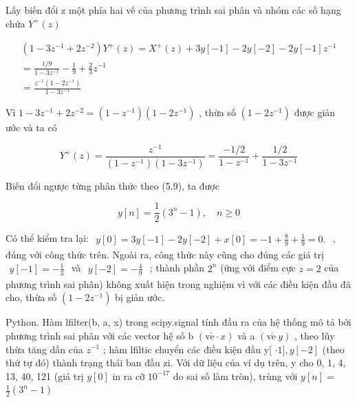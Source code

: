 \documentclass[
  10
]{article}
\begin{document}
Lấy biến đổi z một phía hai vế của phương trình sai phân và nhóm các số
hạng chứa \(Y ^ { + } ( z )\)

\[
\begin{array}{c} (1 - 3 z ^ {- 1} + 2 z ^ {- 2}) Y ^ {+} (z) = X ^ {+} (z) + 3 y [ - 1 ] - 2 y [ - 2 ] - 2 y [ - 1 ] z ^ {- 1} \\ = \frac {1 / 9}{1 - 3 z ^ {- 1}} - \frac {1}{9} + \frac {2}{3} z ^ {- 1} \\ = \frac {z ^ {- 1} (1 - 2 z ^ {- 1})}{1 - 3 z ^ {- 1}} \end{array}
\]

Vì
\(1 - 3 z ^ { - 1 } + 2 z ^ { - 2 } = ( 1 - z ^ { - 1 } ) ( 1 - 2 z ^ { - 1 } )\)
, thừa số \(( 1 - 2 z ^ { - 1 } )\) được giản ước và ta có

\[
Y ^ {+} (z) = \frac {z ^ {- 1}}{(1 - z ^ {- 1}) (1 - 3 z ^ {- 1})} = \frac {- 1 / 2}{1 - z ^ {- 1}} + \frac {1 / 2}{1 - 3 z ^ {- 1}}
\]

Biến đổi ngược từng phân thức theo (5.9), ta được

\[
y [ n ] = \frac {1}{2} \left(3 ^ {n} - 1\right), \quad n \geq 0
\]

Có thể kiểm tra lại:
\(\begin{array} { r } { y [ 0 ] = 3 y [ - 1 ] - 2 y [ - 2 ] + x [ 0 ] = - 1 + \frac { 8 } { 9 } + \frac { 1 } { 9 } = 0 . } \end{array}\)
, đúng với công thức trên. Ngoài ra, công thức này cũng cho đúng các giá
trị
\(\begin{array} { r } { y [ - 1 ] = - \frac { 1 } { 3 } } \end{array}\)
và
\(\begin{array} { r } { y [ - 2 ] = - \frac { 4 } { 9 } } \end{array}\)
; thành phần \(2 ^ { n }\) (ứng với điểm cực \(z = 2\) của phương trình
sai phân) không xuất hiện trong nghiệm vì với các điều kiện đầu đã cho,
thừa số \(( 1 - 2 z ^ { - 1 } )\) bị giản ước. 

Python. Hàm lfilter(b, a, x) trong scipy.signal tính đầu ra của hệ thống
mô tả bởi phương trình sai phân với các vector hệ số b
\(( \mathrm { v } \acute { \mathrm { e } } \cdot x )\) và a
\(( \mathrm { v } \acute { \mathrm { e } } \ y )\) , theo lũy thừa tăng
dần của \(z ^ { - 1 }\) ; hàm lfiltic chuyển các điều kiện đầu y{[}
\(\cdot 1 ] , y [ - 2 ]\) (theo thứ tự đó) thành trạng thái ban đầu zi.
Với dữ liệu của ví dụ trên, y cho 0, 1, 4, 13, 40, 121 (giá trị
\(y [ 0 ]\) in ra cỡ \(1 0 ^ { - 1 7 }\) do sai số làm tròn), trùng với
\(y [ n ] =\) \({ \frac { 1 } { 2 } } ( 3 ^ { n } - 1 )\)
\end{document}
